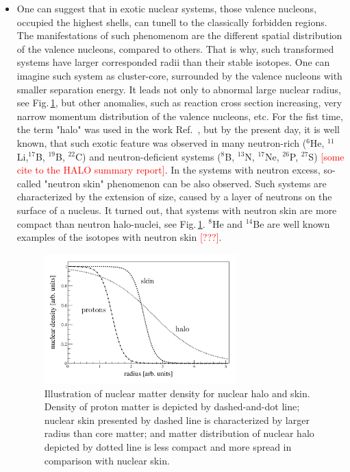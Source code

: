 \begin{itemize}
	\item 
	One can suggest that in exotic nuclear systems, those valence nucleons, occupied the highest shells, can tunell to the classically forbidden regions. 
	The manifestations of such phenomenom are the different spatial distribution of the valence nucleons, compared to others. 
	That is why, such transformed systems have larger corresponded radii than their stable isotopes.
	One can imagine such system as cluster-core, surrounded by the valence nucleons with smaller separation energy.
	It leads not only to abnormal large nuclear radius, see Fig.\,\ref{fig:halo_skin_density}, but other anomalies, such as reaction cross section increasing, very narrow momentum distribution of the valence nucleons, etc.
	For the fist time, the term "halo" was used in the work Ref.\ \cite{Hansen:1987}, but by the present day, it is well known, that such exotic feature was observed in many neutron-rich ($^{6}$He, $^{11}$Li,$^{17}$B, $^{19}$B, $^{22}$C) and neutron-deficient systems ($^{8}$B, $^{13}$N, $^{17}$Ne, $^{26}$P, $^{27}$S) \textcolor{red}{[some cite to the HALO summary report]}.
	In the systems with neutron excess, so-called "neutron skin" phenomenon can be also observed.
	Such systems are characterized by the extension of size, caused by a layer of neutrons on the surface of a nucleus. 
	It turned out, that systems with neutron skin are more compact than neutron halo-nuclei, see Fig.\,\ref{fig:halo_skin_density}. 
	$^{8}$He and $^{14}$Be are well known examples of the isotopes with neutron skin \textcolor{red}{[???]}.
	
	\begin{figure}[t]
		\begin{center}
			\includegraphics[width=0.7\textwidth]{figures/densityDistr.png}
		\end{center}
		\caption{
			Illustration of nuclear matter density for nuclear halo and skin. 
			Density of proton matter is depicted by dashed-and-dot line; nuclear skin presented by dashed
			line is characterized by larger radius than core matter; and matter distribution of
			nuclear halo depicted by dotted line is less compact and more spread in comparison
			with nuclear skin.}
		\label{fig:halo_skin_density}
	\end{figure}
	

\end{itemize}
